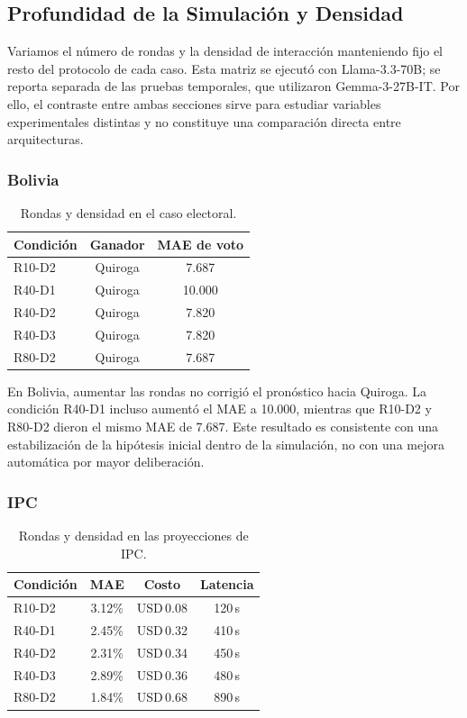 \documentclass{article}
\begin{document}
\subsection{Profundidad de la Simulación y Densidad}

Variamos el número de rondas y la densidad de interacción manteniendo fijo el resto del protocolo de cada caso. Esta matriz se ejecutó con Llama-3.3-70B; se reporta separada de las pruebas temporales, que utilizaron Gemma-3-27B-IT. Por ello, el contraste entre ambas secciones sirve para estudiar variables experimentales distintas y no constituye una comparación directa entre arquitecturas.

\subsubsection{Bolivia}
\begin{table}[H]
    \centering
    \small
    \begin{tabular}{@{}lcc@{}}
        \toprule
        \textbf{Condición} & \textbf{Ganador} & \textbf{MAE de voto} \\ \midrule
        R10-D2 & Quiroga & 7.687 \\
        R40-D1 & Quiroga & 10.000 \\
        R40-D2 & Quiroga & 7.820 \\
        R40-D3 & Quiroga & 7.820 \\
        R80-D2 & Quiroga & 7.687 \\ \bottomrule
    \end{tabular}
    \caption{Rondas y densidad en el caso electoral.}
    \label{tab:rondas_bolivia}
\end{table}

En Bolivia, aumentar las rondas no corrigió el pronóstico hacia Quiroga. La condición R40-D1 incluso aumentó el MAE a 10.000, mientras que R10-D2 y R80-D2 dieron el mismo MAE de 7.687. Este resultado es consistente con una estabilización de la hipótesis inicial dentro de la simulación, no con una mejora automática por mayor deliberación.

\subsubsection{IPC}
\begin{table}[H]
    \centering
    \small
    \begin{tabular}{@{}lccc@{}}
        \toprule
        \textbf{Condición} & \textbf{MAE} & \textbf{Costo} & \textbf{Latencia} \\ \midrule
        R10-D2 & 3.12\% & USD\,0.08 & 120\,s \\
        R40-D1 & 2.45\% & USD\,0.32 & 410\,s \\
        R40-D2 & 2.31\% & USD\,0.34 & 450\,s \\
        R40-D3 & 2.89\% & USD\,0.36 & 480\,s \\
        R80-D2 & 1.84\% & USD\,0.68 & 890\,s \\ \bottomrule
    \end{tabular}
    \caption{Rondas y densidad en las proyecciones de IPC.}
    \label{tab:rondas_ipc}
\end{table}
\end{document}
